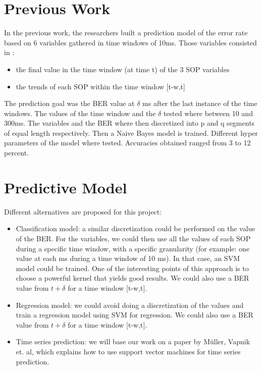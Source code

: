 \documentclass[a4paper]{article}
\begin{document}
\section{Previous Work}

In the previous work, the researchers built a prediction model of the error rate based on 6 variables gathered in time windows of 10ms. Those variables consisted in :
\begin{itemize}
    \item the final value in the time window (at time t) of the 3 SOP variables
    \item the trends of each SOP within the time window [t-w,t]
\end{itemize}
The prediction goal was the BER value at $\delta$ ms after the last instance of the time windows. The values of the time window and the $\delta$ tested where between 10 and 300ms.
The variables and the BER where then discretized into p and q segments of equal length respectively. Then a Naive Bayes model is trained. Different hyper parameters of the model where tested. Accuracies obtained ranged from 3 to 12 percent.

\section{Predictive Model}

Different alternatives are proposed for this project:
\begin{itemize}
\item Classification model: a similar discretization could be performed on the value of the BER. For the variables, we could then use all the values of each SOP during a specific time window, with a specific granularity (for example: one value at each ms during a time window of 10 ms). In that case, an SVM model could be trained. One of the interesting points of this approach is to choose a powerful kernel that yields good results. We could also use a BER value from $t+\delta$ for a time window [t-w,t].
\item Regression model: we could avoid doing a discretization of the values and train a regression model using SVM for regression. We could also use a BER value from $t+\delta$ for a time window [t-w,t].
\item Time series prediction: we will base our work on a paper by  Müller, Vapnik et. al, which explains how to use support vector machines for time series prediction. 
\end{itemize}
\end{document}
